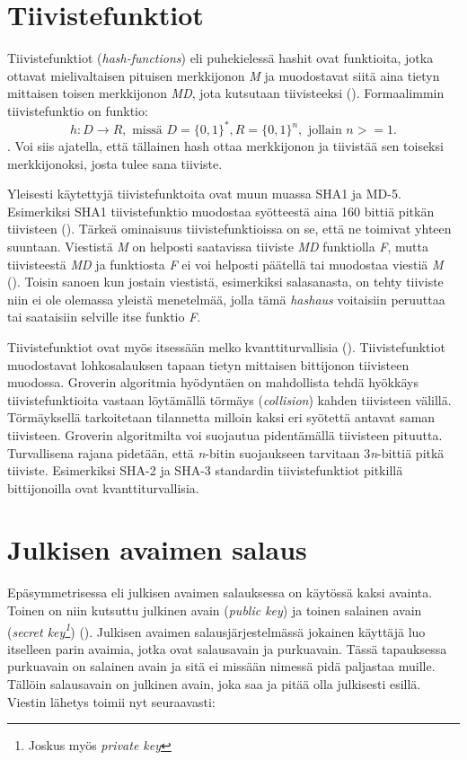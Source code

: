  \section{Tiivistefunktiot}
 Tiivistefunktiot (\emph{hash-functions}) eli puhekielessä hashit  ovat funktioita, jotka ottavat mielivaltaisen pituisen merkkijonon \emph{M} ja muodostavat siitä aina tietyn mittaisen toisen merkkijonon \emph{MD}, jota kutsutaan tiivisteeksi (\cite{sobti2012cryptographic}). Formaalimmin tiivistefunktio on funktio:
 \[h: D \to R, \text{ missä } D = \big\{0,1\big\}^{*}, R = \big\{0,1\big\}^{n}, \text{ jollain } n >= 1.\]. Voi siis ajatella, että tällainen hash ottaa merkkijonon ja tiivistää sen toiseksi merkkijonoksi, josta tulee sana tiiviste.
 
 Yleisesti käytettyjä tiivistefunktoita ovat muun muassa SHA1 ja MD-5. Esimerkiksi SHA1 tiivistefunktio muodostaa syötteestä aina 160 bittiä pitkän tiivisteen (\cite{bellare2005introduction}). Tärkeä ominaisuus tiivistefunktioissa on se, että ne toimivat yhteen suuntaan. Viestistä \emph{M} on helposti saatavissa tiiviste \emph{MD} funktiolla \emph{F}, mutta tiivisteestä \emph{MD} ja funktiosta \emph{F} ei voi helposti päätellä tai muodostaa viestiä \emph{M} (\cite{bakhtiari1995cryptographic}). Toisin sanoen kun jostain viestistä, esimerkiksi salasanasta, on tehty tiiviste niin ei ole olemassa yleistä menetelmää, jolla tämä \emph{hashaus} voitaisiin peruuttaa tai saataisiin selville itse funktio \emph{F}.
 
 Tiivistefunktiot ovat myös itsessään melko kvanttiturvallisia (\cite{mavroeidis2018impact}). Tiivistefunktiot muodostavat lohkosalauksen tapaan tietyn mittaisen bittijonon tiivisteen muodossa. Groverin algoritmia hyödyntäen on mahdollista tehdä hyökkäys tiivistefunktioita vastaan löytämällä törmäys (\emph{collision}) kahden tiivisteen välillä. Törmäyksellä tarkoitetaan tilannetta milloin kaksi eri syötettä antavat saman tiivisteen. Groverin algoritmilta voi suojautua pidentämällä tiivisteen pituutta. Turvallisena rajana pidetään, että \emph{n}-bitin suojaukseen tarvitaan 3\emph{n}-bittiä pitkä tiiviste. Esimerkiksi SHA-2 ja SHA-3 standardin tiivistefunktiot pitkillä bittijonoilla ovat kvanttiturvallisia.
 
 \section{Julkisen avaimen salaus}
 Epäsymmetrisessa eli julkisen avaimen salauksessa on käytössä kaksi avainta. Toinen on niin kutsuttu julkinen avain (\emph{public key}) ja toinen salainen avain (\emph{secret key\footnote{Joskus myös \emph{private key}}}) (\cite{bellare2005introduction}). Julkisen avaimen salausjärjestelmässä jokainen käyttäjä luo itselleen parin avaimia, jotka ovat salausavain ja purkuavain. Tässä tapauksessa purkuavain on salainen avain ja sitä ei missään nimessä pidä paljastaa muille. Tällöin salausavain on julkinen avain, joka saa ja pitää olla julkisesti esillä. Viestin lähetys toimii nyt seuraavasti:
 
